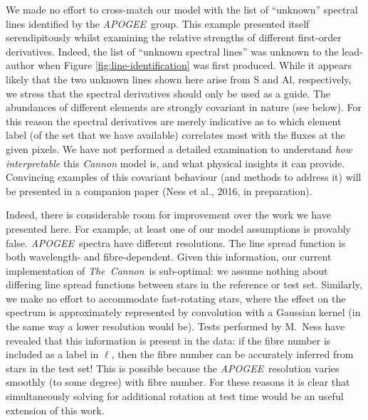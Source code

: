 \documentclass[12pt,preprint]{aastex6}
\newcommand{\project}[1]{\textsl{#1}}
\newcommand{\TheCannon}{\project{The~Cannon}}
\newcommand{\acronym}[1]{{\small{#1}}}
\newcommand{\apogee}{\project{\acronym{APOGEE}}}
\begin{document}
We made no effort to cross-match our model with the list of ``unknown'' spectral lines
identified by the \apogee\ group.  This example presented itself
serendipitously whilst examining the relative strengths of different
first-order derivatives.  Indeed, the list of ``unknown spectral lines''
was unknown to the lead-author when Figure \ref{fig:line-identification} was first produced.  While it appears
likely that the two unknown lines shown here arise from S and Al, respectively,
we stress that the spectral derivatives should only be used as a guide.  The
abundances of different elements are strongly covariant in nature (see below).
For this reason the spectral derivatives are merely indicative as to
which element label (of the set that we have available) correlates
most with the fluxes at the given pixels.  We have not performed
a detailed examination to understand \emph{how interpretable} this
\emph{Cannon} model is, and what physical insights it can provide. 
Convincing examples of this covariant behaviour (and methods to address
it) will be presented in a companion paper (Ness et al., 2016, in preparation). 


Indeed, there is considerable room for improvement over the work
we have presented here.  For example, at least one of our model 
assumptions is provably false. \apogee\ spectra have
different resolutions.  The line spread function is both wavelength- and 
fibre-dependent.  Given this information, our current implementation of \TheCannon\ is  
sub-optimal: we assume nothing about differing line spread functions between 
stars in the reference or test set.  Similarly, we make no effort to 
accommodate fast-rotating stars, where the effect on the spectrum is 
approximately represented by convolution with a Gaussian kernel (in the same way
a lower resolution would be).  Tests performed by M.~Ness have revealed that 
this information is present in the data: if the fibre number is included as a
label in $\ell$, then the fibre number can be accurately inferred from stars
in the test set!  This is possible because the 
\apogee\ resolution varies smoothly (to some degree) with fibre number.  For 
these reasons it is clear that simultaneously solving for additional rotation
at test time would be an useful extension of this work.  
\end{document}
